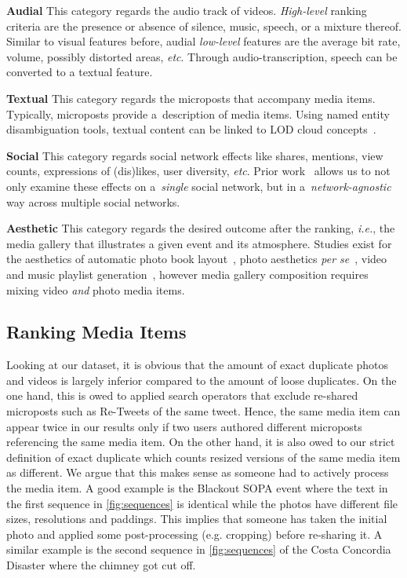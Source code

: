\noindent \textbf{Audial}
This category regards the audio track of videos.
\emph{High-level} ranking criteria are the presence or absence
of silence, music, speech, or a mixture thereof.
Similar to visual features before,
audial \emph{low-level} features are the average bit rate,
volume, possibly distorted areas, \emph{etc}.
Through audio-transcription, speech can be converted to a textual feature.

\noindent \textbf{Textual}
This category regards the microposts that accompany media items.
Typically, microposts provide a~description of media items.
Using named entity disambiguation tools,
textual content can be linked to LOD cloud concepts~\cite{Facebook2011}.

\noindent \textbf{Social}
This category regards social network effects like shares, mentions,
view counts, expressions of (dis)likes, user diversity, \emph{etc}.
Prior work~\cite{Khrouf2012} allows us to not only examine these effects
on a~\emph{single} social network,
but in a~\emph{network-agnostic} way across multiple social networks.

\noindent \textbf{Aesthetic}
This category regards the desired outcome after the ranking, \emph{i.e.},
the media gallery that illustrates a given event and its atmosphere.
Studies exist for the aesthetics of
automatic photo book layout~\cite{Photo2011},
photo aesthetics \emph{per se}~\cite{Photo2012},
video and music playlist generation~\cite{YouTube2010,Playlist2006},
however media gallery composition requires mixing video
\emph{and} photo media items.

\subsection{Ranking Media Items}
Looking at our dataset, it is obvious that the amount of exact duplicate photos and videos is largely inferior compared to the amount of loose duplicates. On the one hand, this is owed to applied search operators that exclude re-shared microposts such as Re-Tweets of the same tweet. Hence, the same media item can appear twice in our results only if two users authored different microposts referencing the same media item. On the other hand, it is also owed to our strict definition of exact duplicate which counts resized versions of the same media item as different. We argue that this makes sense as someone had to actively process the media item. A good example is the Blackout SOPA event where the text in the first sequence in \autoref{fig:sequences} is identical while the photos have different file sizes, resolutions and paddings. This implies that someone has taken the initial photo and applied some post-processing (e.g. cropping) before re-sharing it. A similar example is the second sequence in \autoref{fig:sequences} of the Costa Concordia Disaster where the chimney got cut off.

